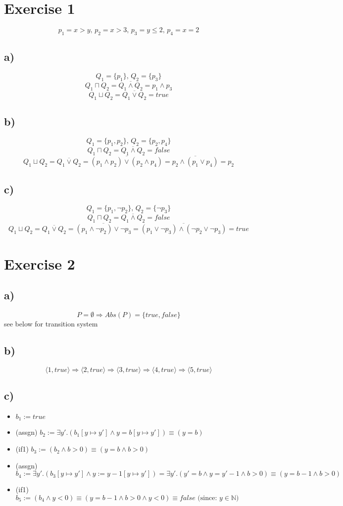 \documentclass[fleqn,12pt]{article}
\begin{document}
\section*{Exercise 1}
$$p_1 = x>y \text{, }p_2 = x>3 \text{, }p_3 = y \leq 2 \text{, } p_4 = x = 2$$
\subsection*{a)}
$$Q_1 = \{p_1\}\text{, } Q_2 =  \{p_3\}$$
$$Q_1 \sqcap Q_2 = \overline{Q_1 \wedge Q_2} = p_1 \wedge p_3 $$
$$Q_1 \sqcup Q_2 = \overline{Q_1 \vee Q_2} = true$$
\subsection*{b)}
$$Q_1 = \{p_1,p_2\}\text{, } Q_2 =  \{p_2,p_4\}$$
$$Q_1 \sqcap Q_2 = \overline{Q_1 \wedge Q_2} = false$$
$$Q_1 \sqcup Q_2 = \overline{Q_1 \vee Q_2} = \overline{(p_1 \wedge p_2) \vee (p_2 \wedge p_4)} = \overline{p_2 \wedge (p_1 \vee p_4)} = p_2$$
\subsection*{c)}
$$Q_1 = \{p_1,\lnot p_2\}\text{, } Q_2 =  \{\lnot p_3\}$$
$$Q_1 \sqcap Q_2 = \overline{Q_1 \wedge Q_2} = false$$
$$Q_1 \sqcup Q_2 = \overline{Q_1 \vee Q_2} = \overline{(p_1 \wedge \lnot p_2) \vee \lnot p_3} = \overline{(p_1 \vee \lnot p_3) \wedge (\lnot p_2 \vee \lnot p_3)} = true$$
\section*{Exercise 2}

\subsection*{a)}
$$P=\emptyset \Rightarrow Abs(P) = \{true,false\}$$
see below for transition system
\subsection*{b)}
$$\langle 1, true \rangle \Rightarrow \langle 2, true \rangle \Rightarrow \langle 3, true \rangle \Rightarrow \langle 4, true \rangle \Rightarrow \langle 5, true \rangle$$
\subsection*{c)}
\begin{itemize}
\item $b_1 := true$
\item (assgn) $b_2 := \exists y'.(b_1[y\mapsto y'] \wedge y=b[y \mapsto y']) \equiv (y=b) $
\item (if1) $b_3 := (b_2 \wedge b > 0) \equiv (y=b \wedge b>0)$
\item (assgn) $b_4 := \exists y'. (b_3[y \mapsto y'] \wedge y := y -1 [y \mapsto y']) =  \exists y'. (y'=b \wedge y = y' - 1 \wedge b>0) \equiv (y=b - 1 \wedge b>0)$
\item (if1) $b_5 := (b_4 \wedge y < 0) \equiv (y=b-1 \wedge b>0 \wedge y<0) \equiv false \text{ (since: }y \in \mathbb{N})$
\end{itemize}
\end{document}
